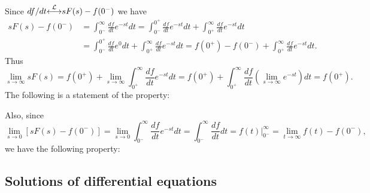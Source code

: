 \documentclass[10pt]{beamer}
\newcommand{\ltpair}{{\stackrel{\cal L}{\longleftrightarrow}}}
\begin{document}
Since $df/dt \ltpair s F(s) - f(0^-)$ we have
\begin{align*}
  s F(s) - f(0^-) &= \int_{0^-}^\infty \frac{df}{dt} e^{-st} dt
  = \int_{0^-}^{0^+} \frac{df}{dt} e^{-st} dt + \int_{0^+}^\infty \frac{df}{dt} e^{-st} dt \\
  &= \int_{0^-}^{0^+} \frac{df}{dt} e^{0} dt + \int_{0^+}^\infty \frac{df}{dt} e^{-st} dt
  = f(0^+) - f(0^-) + \int_{0^+}^\infty \frac{df}{dt} e^{-st} dt.
\end{align*}
Thus 
\begin{equation*}
  \lim_{s \to \infty} s F(s) = f(0^+) + \lim_{s \to \infty} \int_{0^+}^\infty \frac{df}{dt} e^{-st} dt
  = f(0^+) + \int_{0^+}^\infty \frac{df}{dt} \left( \lim_{s \to \infty} e^{-st} \right) dt = f(0^+).
\end{equation*}
The following is a statement of the property:
\begin{center}
\end{center}

Also, since 
\begin{equation*}
  \lim_{s \to 0} [s F(s) - f(0^-)] = \lim_{s \to 0} \int_{0^-}^\infty \frac{df}{dt} e^{-st} dt
  = \int_{0^-}^\infty \frac{df}{dt}dt = \left. f(t) \right|_{0^-}^\infty = \lim_{t \to \infty} f(t) - f(0^-),
\end{equation*}
we have the following property:
\begin{center}
\end{center}

\subsection{Solutions of differential equations}
\end{document}
